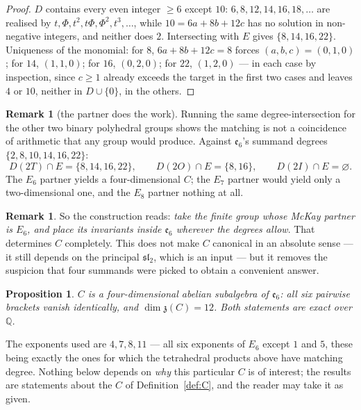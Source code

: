 \documentclass[11pt,a4paper]{article}
\newtheorem{proposition}[theorem]{Proposition}
\theoremstyle{definition}
\newtheorem{remark}[theorem]{Remark}
\theoremstyle{remark}
\newcommand{\esix}{\mathfrak{e}_6}
\newcommand{\slt}{\mathfrak{sl}_2}
\newcommand{\z}{\mathfrak{z}}
\newcommand{\Q}{\mathbb{Q}}
\begin{document}
\begin{proof}
$D$ contains every even integer $\ge6$ except $10$: $6,8,12,14,16,18,\dots$ are realised by
$t,\Phi,t^2,t\Phi,\Phi^2,t^3,\dots$, while $10=6a+8b+12c$ has no solution in non-negative
integers, and neither does $2$. Intersecting with $E$ gives $\{8,14,16,22\}$. Uniqueness of the
monomial: for $8$, $6a+8b+12c=8$ forces $(a,b,c)=(0,1,0)$; for $14$, $(1,1,0)$; for $16$,
$(0,2,0)$; for $22$, $(1,2,0)$ --- in each case by inspection, since $c\ge1$ already exceeds the
target in the first two cases and leaves $4$ or $10$, neither in $D\cup\{0\}$, in the others.
\end{proof}

\begin{remark}[the partner does the work]
Running the same degree-intersection for the other two binary polyhedral groups shows the
matching is not a coincidence of arithmetic that any group would produce. Against $\esix$'s
summand degrees $\{2,8,10,14,16,22\}$:
\[
   D(2T)\cap E=\{8,14,16,22\},\qquad D(2O)\cap E=\{8,16\},\qquad D(2I)\cap E=\varnothing .
\]
The $E_6$ partner yields a four-dimensional $C$; the $E_7$ partner would yield only a
two-dimensional one, and the $E_8$ partner nothing at all.
\end{remark}

\begin{remark}
So the construction reads: \emph{take the finite group whose McKay partner is $E_6$, and place
its invariants inside $\esix$ wherever the degrees allow}. That determines $C$ completely. This
does not make $C$ canonical in an absolute sense --- it still depends on the principal $\slt$,
which is an input --- but it removes the suspicion that four summands were picked to obtain a
convenient answer.
\end{remark}

\begin{proposition}\label{prop:abelian}
$C$ is a four-dimensional abelian subalgebra of $\esix$: all six pairwise brackets vanish
identically, and $\dim\z(C)=12$. Both statements are exact over $\Q$.
\end{proposition}

The exponents used are $4,7,8,11$ --- all six exponents of $E_6$ except $1$ and $5$, these
being exactly the ones for which the tetrahedral products above have matching degree.
Nothing below depends on \emph{why} this particular $C$ is of interest; the results are
statements about the $C$ of Definition~\ref{def:C}, and the reader may take it as given.
\end{document}
